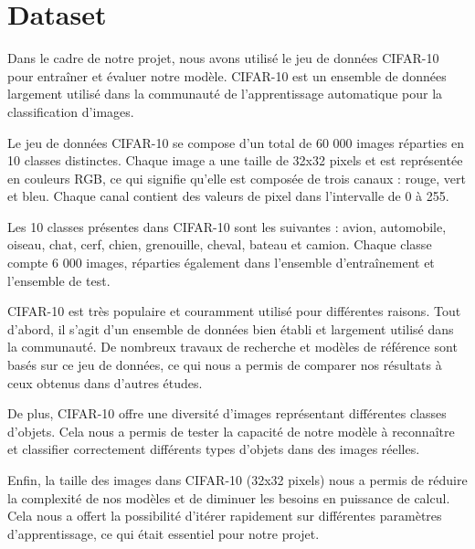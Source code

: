 \section{Dataset}

Dans le cadre de notre projet, nous avons utilisé le jeu de données CIFAR-10 pour entraîner et évaluer notre modèle. CIFAR-10 est un ensemble de données largement utilisé dans la communauté de l'apprentissage automatique pour la classification d'images.

Le jeu de données CIFAR-10 se compose d'un total de 60 000 images réparties en 10 classes distinctes. Chaque image a une taille de 32x32 pixels et est représentée en couleurs RGB, ce qui signifie qu'elle est composée de trois canaux : rouge, vert et bleu. Chaque canal contient des valeurs de pixel dans l'intervalle de 0 à 255.

Les 10 classes présentes dans CIFAR-10 sont les suivantes : avion, automobile, oiseau, chat, cerf, chien, grenouille, cheval, bateau et camion. Chaque classe compte 6 000 images, réparties également dans l'ensemble d'entraînement et l'ensemble de test.

CIFAR-10 est très populaire et couramment utilisé pour différentes raisons. Tout d'abord, il s'agit d'un ensemble de données bien établi et largement utilisé dans la communauté. De nombreux travaux de recherche et modèles de référence sont basés sur ce jeu de données, ce qui nous a permis de comparer nos résultats à ceux obtenus dans d'autres études.

De plus, CIFAR-10 offre une diversité d'images représentant différentes classes d'objets. Cela nous a permis de tester la capacité de notre modèle à reconnaître et classifier correctement différents types d'objets dans des images réelles.

Enfin, la taille des images dans CIFAR-10 (32x32 pixels) nous a permis de réduire la complexité de nos modèles et de diminuer les besoins en puissance de calcul. Cela nous a offert la possibilité d'itérer rapidement sur différentes paramètres d'apprentissage, ce qui était essentiel pour notre projet.